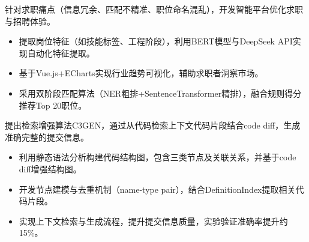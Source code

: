 \documentclass{../../styles/resume}
\begin{document}
\begin{onehalfspacing}
针对求职痛点（信息冗余、匹配不精准、职位命名混乱），开发智能平台优化求职与招聘体验。
\begin{itemize}
  \item 提取岗位特征（如技能标签、工程阶段），利用BERT模型与DeepSeek API实现自动化特征提取。
  \item 基于Vue.js+ECharts实现行业趋势可视化，辅助求职者洞察市场。
  \item 采用双阶段匹配算法（NER粗排+SentenceTransformer精排），融合规则得分推荐Top 20职位。
\end{itemize}


\end{onehalfspacing}
\begin{onehalfspacing}
提出检索增强算法C3GEN，通过从代码检索上下文代码片段结合code diff，生成准确完整的提交信息。
\begin{itemize}
  \item 利用静态语法分析构建代码结构图，包含三类节点及关联关系，并基于code diff增强结构图。
  \item 开发节点建模与去重机制（name-type pair），结合DefinitionIndex提取相关代码片段。
  \item 实现上下文检索与生成流程，提升提交信息质量，实验验证准确率提升约15\%。
\end{itemize}
\end{onehalfspacing}


\end{document}
